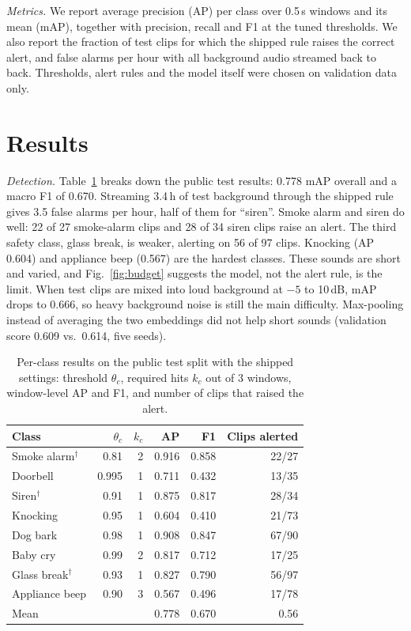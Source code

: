 \documentclass[conference,a4paper]{IEEEtran}
\begin{document}
\textit{Metrics.} We report average precision (AP) per class over 0.5\,s windows and its mean (mAP), together with precision, recall and F1 at the tuned thresholds. We also report the fraction of test clips for which the shipped rule raises the correct alert, and false alarms per hour with all background audio streamed back to back. Thresholds, alert rules and the model itself were chosen on validation data only.

\section{Results}
\textit{Detection.} Table~\ref{tab:perclass} breaks down the public test results: 0.778 mAP overall and a macro F1 of 0.670. Streaming 3.4\,h of test background through the shipped rule gives 3.5 false alarms per hour, half of them for ``siren''. Smoke alarm and siren do well: 22 of 27 smoke-alarm clips and 28 of 34 siren clips raise an alert. The third safety class, glass break, is weaker, alerting on 56 of 97 clips. Knocking (AP 0.604) and appliance beep (0.567) are the hardest classes. These sounds are short and varied, and Fig.~\ref{fig:budget} suggests the model, not the alert rule, is the limit. When test clips are mixed into loud background at $-5$ to 10\,dB, mAP drops to 0.666, so heavy background noise is still the main difficulty. Max-pooling instead of averaging the two embeddings did not help short sounds (validation score 0.609 vs.\ 0.614, five seeds).

\begin{table}[t]
\caption{Per-class results on the public test split with the shipped settings: threshold $\theta_c$, required hits $k_c$ out of 3 windows, window-level AP and F1, and number of clips that raised the alert.}
\label{tab:perclass}
\centering\footnotesize
\setlength{\tabcolsep}{4pt}
\begin{tabular}{@{}lrrrrr@{}}
\toprule
Class & $\theta_c$ & $k_c$ & AP & F1 & Clips alerted \\
\midrule
Smoke alarm$^\dagger$ & 0.81 & 2 & 0.916 & 0.858 & 22/27 \\
Doorbell & 0.995 & 1 & 0.711 & 0.432 & 13/35 \\
Siren$^\dagger$ & 0.91 & 1 & 0.875 & 0.817 & 28/34 \\
Knocking & 0.95 & 1 & 0.604 & 0.410 & 21/73 \\
Dog bark & 0.98 & 1 & 0.908 & 0.847 & 67/90 \\
Baby cry & 0.99 & 2 & 0.817 & 0.712 & 17/25 \\
Glass break$^\dagger$ & 0.93 & 1 & 0.827 & 0.790 & 56/97 \\
Appliance beep & 0.90 & 3 & 0.567 & 0.496 & 17/78 \\
\midrule
Mean & & & 0.778 & 0.670 & 0.56 \\
\bottomrule
\end{tabular}
\end{table}
\end{document}
